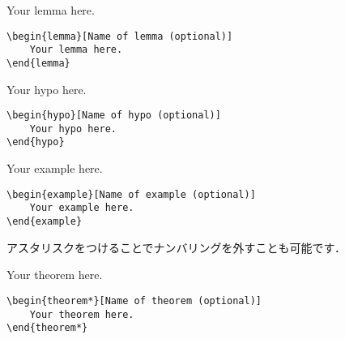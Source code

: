 \documentclass[xelatex,ja=standard,b5j,8pt,magstyle=nomag*,japaram={units}]{bxjsarticle}
\begin{document}
\begin{multicols}{2}
\begin{lemma}
    Your lemma here.
\end{lemma}

\columnbreak

\begin{lstlisting}
\begin{lemma}[Name of lemma (optional)]
    Your lemma here.
\end{lemma}
\end{lstlisting}
    
\end{multicols}


\begin{multicols}{2}
\begin{hypo}
    Your hypo here.
\end{hypo}

\columnbreak

\begin{lstlisting}
\begin{hypo}[Name of hypo (optional)]
    Your hypo here.
\end{hypo}
\end{lstlisting}
    
\end{multicols}


\begin{multicols}{2}
\begin{example}
    Your example here.
\end{example}

\columnbreak

\begin{lstlisting}
\begin{example}[Name of example (optional)]
    Your example here.
\end{example}
\end{lstlisting}
    
\end{multicols}
    

アスタリスクをつけることでナンバリングを外すことも可能です．
\begin{multicols}{2}
\begin{theorem*}
    Your theorem here.
\end{theorem*}

\columnbreak

\begin{lstlisting}
\begin{theorem*}[Name of theorem (optional)]
    Your theorem here.
\end{theorem*}
\end{lstlisting}
    
\end{multicols}
\end{document}
